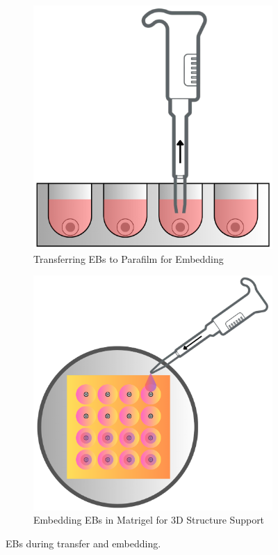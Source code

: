\documentclass[11pt]{article}
\begin{document}
\begin{figure}[H]
    \centering
    \begin{subfigure}[b]{0.4\textwidth}
        \centering
        \includegraphics[width=\textwidth]{2.png}
        \caption{Transferring EBs to Parafilm for Embedding}
        \label{fig:transferring_EBs}
    \end{subfigure}
    \hfill
    \begin{subfigure}[b]{0.4\textwidth}
        \centering
        \includegraphics[width=\textwidth]{3.png}
        \caption{Embedding EBs in Matrigel for 3D Structure Support}
        \label{fig:embedding}
    \end{subfigure}
    \caption{EBs during transfer and embedding.}
    \label{fig:2_and_3}
\end{figure}
\end{document}
